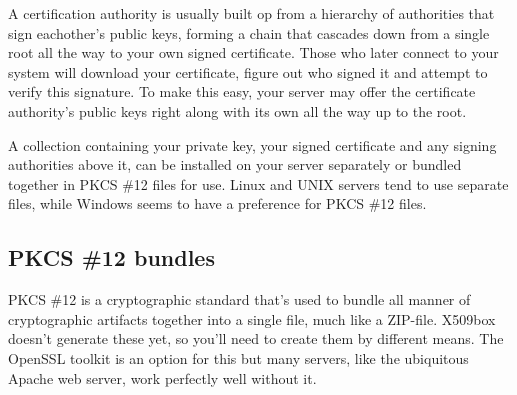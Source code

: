 \documentclass[a4paper,12pt]{article}
\begin{document}
A certification authority is usually built op from a hierarchy of authorities that sign eachother's public keys, forming a chain that cascades down from a single root all the way to your own signed certificate. Those who later connect to your system will download your certificate, figure out who signed it and attempt to verify this signature. To make this easy, your server may offer the certificate authority's public keys right along with its own all the way up to the root.

A collection containing your private key, your signed certificate and any signing authorities above it, can be installed on your server separately or bundled together in PKCS \#12 files for use. Linux and UNIX servers tend to use separate files, while Windows seems to have a preference for PKCS \#12 files.

\subsection{PKCS \#12 bundles}
PKCS \#12 is a cryptographic standard that's used to bundle all manner of cryptographic artifacts together into a single file, much like a ZIP-file. X509box doesn't generate these yet, so you'll need to create them by different means. The OpenSSL toolkit is an option for this but many servers, like the ubiquitous Apache web server, work perfectly well without it.
\end{document}
